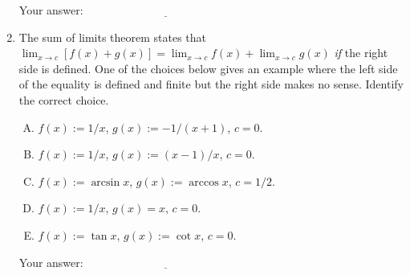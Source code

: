 \documentclass[10pt]{amsart}
\begin{document}
\begin{enumerate}
  \vspace{0.1in}
  Your answer: $\underline{\qquad\qquad\qquad\qquad\qquad\qquad\qquad}$
  \vspace{0.15in}

\item The sum of limits theorem states that $\lim_{x \to c} [f(x) +
  g(x)] = \lim_{x \to c} f(x) + \lim_{x \to c} g(x)$ {\em if} the
  right side is defined. One of the choices below gives an example
  where the left side of the equality is defined and finite but the right side
  makes no sense. Identify the correct choice.

  \begin{enumerate}[(A)]
  \item $f(x) := 1/x$, $g(x) := -1/(x + 1)$, $c = 0$.
  \item $f(x) := 1/x$, $g(x) := (x - 1)/x$, $c = 0$.
  \item $f(x) := \arcsin x$, $g(x) := \arccos x$, $c = 1/2$.
  \item $f(x) := 1/x$, $g(x) = x$, $c = 0$.
  \item $f(x) := \tan x$, $g(x) := \cot x$, $c = 0$.
  \end{enumerate}

  \vspace{0.1in}
  Your answer: $\underline{\qquad\qquad\qquad\qquad\qquad\qquad\qquad}$
  \vspace{0.15in}

\end{enumerate}
\end{document}
